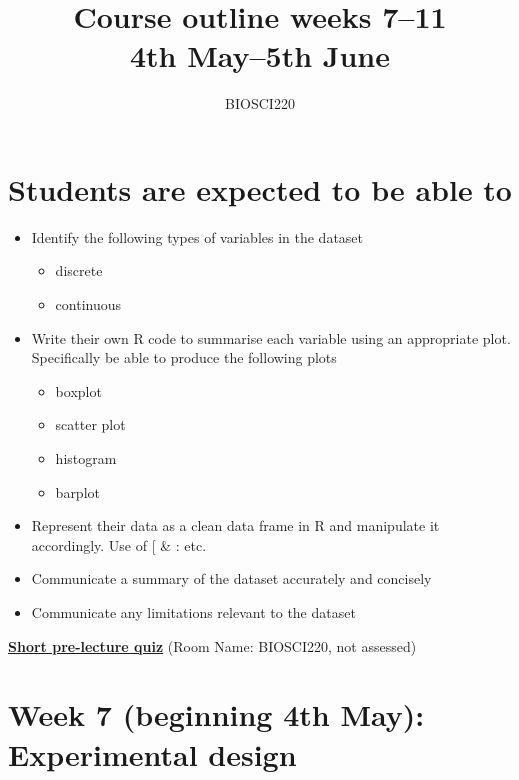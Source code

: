 \documentclass{article}
\begin{document}
\title{Course outline weeks 7--11\\ 4th May--5th June}
\author{BIOSCI220}
\date{}
\maketitle


\section*{Students are expected to be able to}
\begin{itemize}
\item Identify the following types of variables in the dataset
  \begin{itemize}
  \item discrete
  \item continuous
  \end{itemize}
\item Write their own R code to summarise each variable using an appropriate plot. Specifically be able to produce the following plots
  \begin{itemize}
  \item boxplot
  \item scatter plot
  \item histogram
  \item barplot
  \end{itemize}
\item Represent their data as a clean data frame in R and manipulate it accordingly. Use of [ \& : etc.
\item Communicate a summary of the dataset accurately and concisely
\item Communicate any limitations relevant to the dataset
\end{itemize}

\begin{center}
   \href{https://b.socrative.com/login/student/}{\textbf{\Large Short pre-lecture quiz}} (Room Name: BIOSCI220, not assessed)
  
\end{center}


\newpage


\section*{Week 7 (beginning 4th May):  Experimental design}
\end{document}
